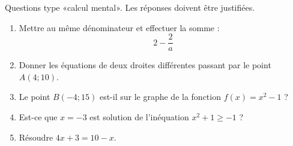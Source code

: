 
\begin{exercice}[\ldots/4]\label{exosmath-0693}

    Questions type «calcul mental». Les réponses doivent être justifiées.
    \begin{multicols}{2}
        \begin{enumerate}
            \item
                Mettre au même dénominateur et effectuer la somme :
                \begin{equation}
                    2-\frac{ 2 }{ a }
                \end{equation}
            \item
                Donner les équations de deux droites différentes passant par le point \( A(4;10)\).
            \item
                Le point \( B(-4;15)\) est-il sur le graphe de la fonction \( f(x)=x^2-1\) ?
            \item
                Est-ce que \( x=-3\) est solution de l'inéquation \( x^2+1\geq -1\) ?
            \item
                Résoudre $4x+3=10-x$.
        \end{enumerate}
    \end{multicols}

\end{exercice}
